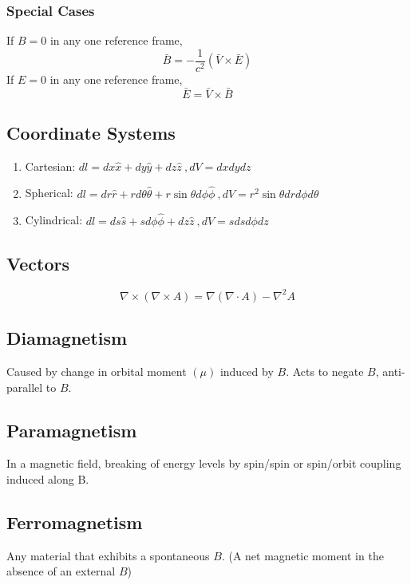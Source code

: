\documentclass[10pt,a4paper]{article}
\begin{document}
\subsubsection{Special Cases}
If $B=0$ in any one reference frame, 
\begin{equation}
  \bar{B} = -\frac{1}{c^2}(\bar{V} \times \bar{E})
\end{equation}
If $E=0 $ in any one reference frame,
\begin{equation}
 \bar{E} = \bar{V} \times \bar{B} 
\end{equation}

\subsection{Coordinate Systems}
\begin{enumerate}
    \item Cartesian: $dl = dx\hat{x} + dy\hat{y} + dz\hat{z}~, dV = dxdydz$
    \item Spherical: $dl = dr\hat{r} + rd\theta \hat{\theta} + r\sin \theta d\phi \hat{\phi}~, dV = r^2 \sin \theta dr d\phi d\theta$
    \item Cylindrical: $dl = ds\hat{s} + sd\phi \hat{\phi} + dz\hat{z}~,dV = sdsd\phi dz$
\end{enumerate}

\subsection{Vectors}
\begin{equation}
 \nabla \times (\nabla \times A) = \nabla (\nabla \cdot A) - \nabla^2A 
\end{equation}

\subsection{Diamagnetism}
Caused by change in orbital moment $(\mu)$ induced by $B$. Acts to negate $B$, anti-parallel to $B$.

\subsection{Paramagnetism}
In a magnetic field, breaking of energy levels by spin/spin or spin/orbit coupling induced along B.

\subsection{Ferromagnetism}
Any material that exhibits a spontaneous $B$. (A net magnetic moment in the absence of an external $B$)
\end{document}

